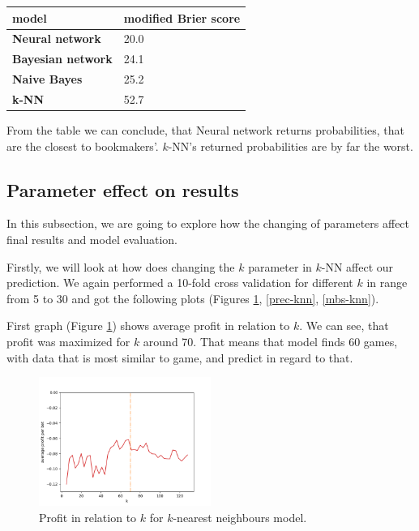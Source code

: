 \documentclass[conference]{IEEEtran}
\begin{document}
\begin{table}[!ht]
    \centering
    \begin{tabular}{|l|l|}
    \hline
        \textbf{model} & modified Brier score \\ \hline
        \textbf{Neural network} & 20.0 \\ \hline
        \textbf{Bayesian network} & 24.1 \\ \hline
        \textbf{Naive Bayes} & 25.2 \\ \hline
        \textbf{k-NN} & 52.7 \\ \hline
    \end{tabular}
\end{table}

From the table we can conclude, that Neural network returns probabilities, that are the 
closest to bookmakers'. $k$-NN's returned probabilities are by far the worst.

\subsection{Parameter effect on results}

In this subsection, we are going to explore how the changing of parameters affect final 
results and model evaluation. 

Firstly, we will look at how does changing the $k$ parameter in $k$-NN affect our prediction.
We again performed a 10-fold cross validation for different $k$ in range from 5 to 30 and got
the following plots (Figures \ref{profit-knn}, \ref{prec-knn}, \ref{mbs-knn}).

First graph (Figure \ref{profit-knn}) shows average profit in relation to $k$. We can see, 
that profit was maximized for $k$ around 70. That means that model finds 60 games, with data
that is most similar to game, and predict in regard to that.

\begin{figure}[!ht]
\includegraphics[width=0.5\textwidth]{profit_k_knn.png}
\caption{Profit in relation to $k$ for $k$-nearest neighbours model.}
\label{profit-knn}
\end{figure}
\end{document}
